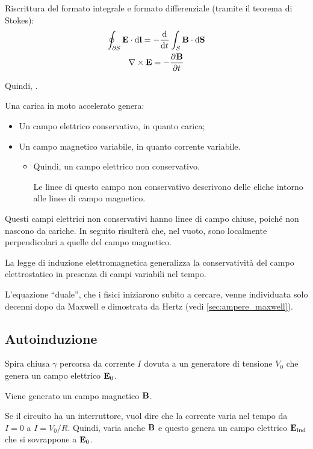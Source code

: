 Riscrittura del formato integrale e formato differenziale (tramite il teorema di Stokes):
\begin{gather}
    \oint_{\partial S} \E \lde = -\der{t} \int_S \B \sde \\
    \curl \E = - \parder[\B]{t}
\end{gather}

Quindi, .

Una carica in moto accelerato genera:
\begin{itemize}
    \item Un campo elettrico conservativo, in quanto carica;
    \item Un campo magnetico variabile, in quanto corrente variabile.
    \begin{itemize}
        \item Quindi, un campo elettrico non conservativo.

        Le linee di questo campo non conservativo descrivono delle eliche intorno alle linee di campo magnetico.
    \end{itemize}
\end{itemize}

Questi campi elettrici non conservativi hanno linee di campo chiuse, poiché non nascono da cariche.
In seguito risulterà che, nel vuoto, sono localmente perpendicolari a quelle del campo magnetico.

La legge di induzione elettromagnetica generalizza la conservatività del campo elettrostatico in presenza di campi variabili nel tempo.

L'equazione ``duale'', che i fisici iniziarono subito a cercare, venne individuata solo decenni dopo da Maxwell e dimostrata da Hertz (vedi \autoref{sec:ampere_maxwell}).

\subsection{Autoinduzione}

Spira chiusa $\gamma$ percorsa da corrente $I$ dovuta a un generatore di tensione $V_0$ che genera un campo elettrico $\mathbf{E}_0$.

Viene generato un campo magnetico $\mathbf{B}$.

Se il circuito ha un interruttore, vuol dire che la corrente varia nel tempo da $I = 0$ a $I = V_0/R$.
Quindi, varia anche $\mathbf{B}$ e questo genera un campo elettrico $\mathbf{E}_\text{ind}$ che si sovrappone a $\mathbf{E}_0$.

